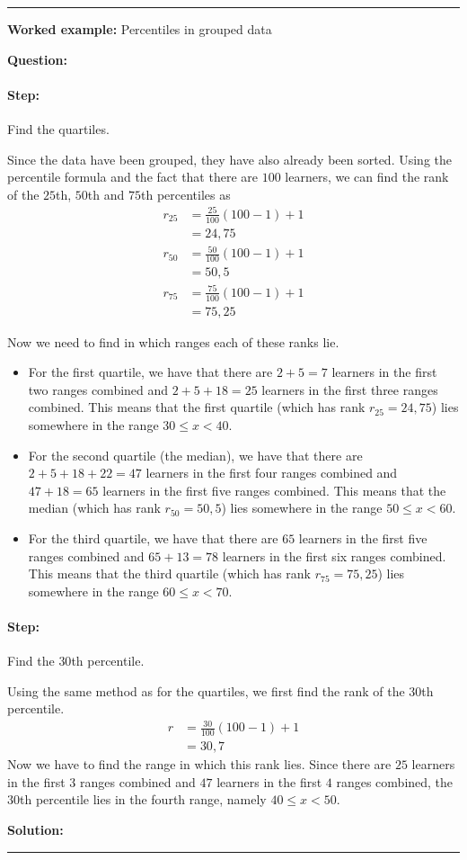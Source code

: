 \documentclass[a4paper,11pt]{report}
\newenvironment{wex}[3]%
{\rule{\linewidth}{0.5mm}
\textbf{Worked example:} #1

\textbf{Question:} #2

\textbf{Solution:} #3}%
{\rule{\linewidth}{0.5mm}}
\newcommand{\westep}[1]{\paragraph{Step:} #1}
\begin{document}
\begin{wex}{Percentiles in grouped data}
{  \westep{Find the quartiles.}

  Since the data have been grouped, they have also already been
  sorted. Using the percentile formula and the fact that there are
  $100$ learners, we can find the rank of the $25$th, $50$th and
  $75$th percentiles as
  \begin{align}
    r_{25} &= \frac{25}{100}\left(100-1\right)+1 \\
          &= 24,75 \\
    r_{50} &= \frac{50}{100}\left(100-1\right)+1 \\
          &= 50,5 \\
    r_{75} &= \frac{75}{100}\left(100-1\right)+1 \\
          &= 75,25
  \end{align}

  Now we need to find in which ranges each of these ranks lie.
  \begin{itemize}
  \item For the first quartile, we have that there are $2 + 5 = 7$
    learners in the first two ranges combined and $2 + 5 + 18 = 25$
    learners in the first three ranges combined. This means that the
    first quartile (which has rank $r_{25} = 24,75$) lies somewhere in
    the range $30 \le x < 40$.
  \item For the second quartile (the median), we have that there are
    $2 + 5 + 18 + 22 = 47$ learners in the first four ranges combined
    and $47 + 18 = 65$ learners in the first five ranges
    combined. This means that the median (which has rank $r_{50} =
    50,5$) lies somewhere in the range $50 \le x < 60$.
  \item For the third quartile, we have that there are $65$ learners
    in the first five ranges combined and $65 + 13 = 78$ learners in
    the first six ranges combined. This means that the third quartile
    (which has rank $r_{75} = 75,25$) lies somewhere in the range $60
    \le x < 70$.
  \end{itemize}

  \westep{Find the $30$th percentile.}

  Using the same method as for the quartiles, we first find the rank
  of the $30$th percentile.
  \begin{align}
    r &= \frac{30}{100}\left(100-1\right)+1 \\
      &= 30,7
  \end{align}
  Now we have to find the range in which this rank lies. Since there
  are $25$ learners in the first $3$ ranges combined and $47$ learners
  in the first $4$ ranges combined, the $30$th percentile lies in the
  fourth range, namely $40 \le x < 50$.

}
\end{wex}
\end{document}
